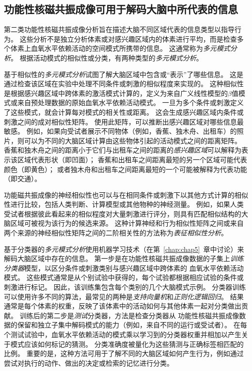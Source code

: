 \subsection{功能性核磁共振成像可用于解码大脑中所代表的信息}

第二类功能性核磁共振成像分析旨在描述大脑不同区域代表的信息类型以指导行为。
这些分析不是独立分析体素或对感兴趣区域内的体素进行平均，而是检查多个体素上血氧水平依赖活动的空间模式所携带的信息。 
这通常称为\textit{多元模式分析}。
根据活动模式的相似性或分类，有两种类型的\textit{多元模式分析}。


基于相似性的\textit{多元模式分析}试图了解大脑区域中包含或“表示”了哪些信息。 
这是通过检查该区域在实验中处理不同条件或刺激的相似程度来实现的。 
这种相似性是根据感兴趣区域中跨体素的激活模式计算的，定义为来自广义线性模型的$\beta$值模式或来自预处理数据的原始血氧水平依赖活动模式。 
一旦为多个条件或刺激定义了这些模式，就会计算每对模式的相关性或距离。 
这会生成感兴趣区域内条件或刺激之间的成对相似性矩阵。 
使用此矩阵，可以推断出感兴趣区域对哪些信息最敏感。 
例如，如果向受试者展示不同物体（例如，香蕉、独木舟、出租车）的照片，则可以为不同的大脑区域计算由这些物体引起的活动模式之间的距离矩阵。
香蕉和独木舟之间的距离小于它们与出租车之间的距离的\textit{感兴趣区域}可以解释为表示该区域代表形状（即凹面）；
香蕉和出租车之间距离最短的另一个区域可能代表颜色（即黄色）；
或者独木舟和出租车之间距离最短的一个可能被解释为代表功能（即交通）。


功能磁共振成像的神经相似性也可以与在相同条件或刺激下以其他方式计算的相似性进行比较，包括人类判断、计算模型或其他物种的神经测量。
例如，如果人类受试者根据彼此看起来的相似程度对大量刺激进行评分，则具有匹配相似结构的大脑区域可被视为该行为的候选来源。
这种计算神经和行为相似性矩阵之间或来自两个来源的神经相似性矩阵之间的二阶相关性的方法称为\textit{表征相似性分析}。


基于分类器的\textit{多元模式分析}使用机器学习技术（在第~\ref{chap:chap5}~章中讨论）来解码大脑区域中存在的信息。 
第一步是在功能性核磁共振成像数据的子集上\textit{训练分类器}模型，以区分条件或刺激类别与感兴趣区域中跨体素的 血氧水平依赖活动模式。
这些模式通常是从个别试验中获得的，每个试验都根据相应试验的条件或刺激进行标记。
因此，该训练集包含每个类别的几个大脑模式示例。
分类器训练可以使用许多不同的算法，最常见的两种是\textit{支持向量机}和\textit{正则化逻辑回归}。
结果通常是每个体素的权重，反映了该体素中的活动如何与其他体素一起对分类做出贡献。
训练后的第二步是\textit{测试}分类器，方法是检查分类器从 功能性核磁共振成像数据的保留和独立子集中解码模式的能力（例如，来自不同的运行或受试者）。
在每个测试试验中，血氧水平依赖活动的模式乘以学习到的分类器权重并相加以产生关于模式应该如何标记的猜测。
分类准确度被量化为这些猜测与正确标签相匹配的比例。
重要的是，这种方法可用于了解不同的大脑区域如何产生行为，例如通过尝试对执行的动作、做出的决定或检索的记忆进行分类。



